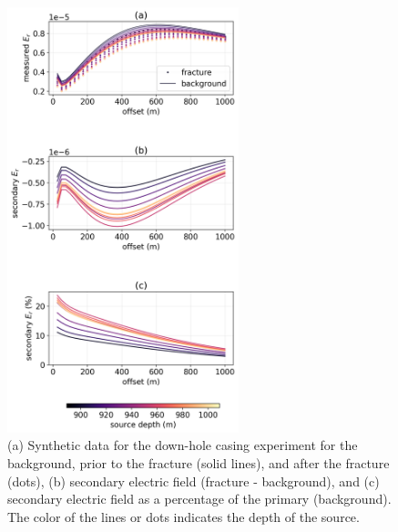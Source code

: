 \begin{figure}
    \begin{center}
    \includegraphics[width=0.6\textwidth]{figures/inversion/dc_casing_initial_data.png}
    \end{center}
\caption{
    (a) Synthetic data for the down-hole casing experiment for the background,
    prior to the fracture (solid lines), and after the fracture (dots), (b) secondary
    electric field (fracture - background), and (c) secondary electric field as a percentage
    of the primary (background). The color of the lines or dots indicates the depth of the source.
}
\label{fig:dc_casing_initial_data}
\end{figure}
